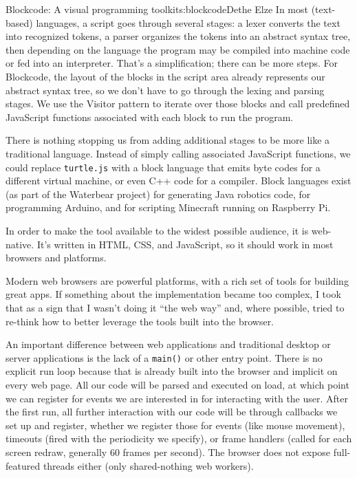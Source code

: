 \begin{aosachapter}{Blockcode: A visual programming toolkit}{s:blockcode}{Dethe Elze}
In most (text-based) languages, a script goes through several stages: a
lexer converts the text into recognized tokens, a parser organizes the
tokens into an abstract syntax tree, then depending on the language the
program may be compiled into machine code or fed into an interpreter.
That's a simplification; there can be more steps. For Blockcode, the
layout of the blocks in the script area already represents our abstract
syntax tree, so we don't have to go through the lexing and parsing
stages. We use the Visitor pattern to iterate over those blocks and call
predefined JavaScript functions associated with each block to run the
program.

There is nothing stopping us from adding additional stages to be more
like a traditional language. Instead of simply calling associated
JavaScript functions, we could replace \texttt{turtle.js} with a block
language that emits byte codes for a different virtual machine, or even
C++ code for a compiler. Block languages exist (as part of the Waterbear
project) for generating Java robotics code, for programming Arduino, and
for scripting Minecraft running on Raspberry Pi.

\label{web-applications}

In order to make the tool available to the widest possible audience, it
is web-native. It's written in HTML, CSS, and JavaScript, so it should
work in most browsers and platforms.

Modern web browsers are powerful platforms, with a rich set of tools for
building great apps. If something about the implementation became too
complex, I took that as a sign that I wasn't doing it ``the web way''
and, where possible, tried to re-think how to better leverage the tools
built into the browser.

An important difference between web applications and traditional desktop
or server applications is the lack of a \texttt{main()} or other entry
point. There is no explicit run loop because that is already built into
the browser and implicit on every web page. All our code will be parsed
and executed on load, at which point we can register for events we are
interested in for interacting with the user. After the first run, all
further interaction with our code will be through callbacks we set up
and register, whether we register those for events (like mouse
movement), timeouts (fired with the periodicity we specify), or frame
handlers (called for each screen redraw, generally 60 frames per
second). The browser does not expose full-featured threads either (only
shared-nothing web workers).


\end{aosachapter}
